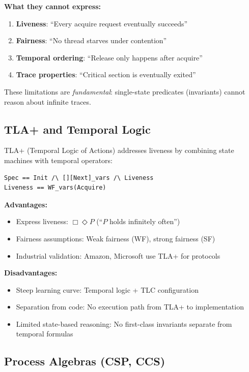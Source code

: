 \documentclass[conference]{IEEEtran}
\begin{document}
\textbf{What they cannot express:}

\begin{enumerate}
\item \textbf{Liveness}: ``Every acquire request eventually succeeds''
\item \textbf{Fairness}: ``No thread starves under contention''
\item \textbf{Temporal ordering}: ``Release only happens after acquire''
\item \textbf{Trace properties}: ``Critical section is eventually exited''
\end{enumerate}

These limitations are \textit{fundamental}: single-state predicates (invariants) cannot reason about infinite traces.

\subsection{TLA+ and Temporal Logic}

TLA+ (Temporal Logic of Actions) \cite{lamport2002} addresses liveness by combining state machines with temporal operators:

\begin{verbatim}
Spec == Init /\ [][Next]_vars /\ Liveness
Liveness == WF_vars(Acquire)
\end{verbatim}

\textbf{Advantages:}
\begin{itemize}
\item Express liveness: $\Box\Diamond P$ (``$P$ holds infinitely often'')
\item Fairness assumptions: Weak fairness (WF), strong fairness (SF)
\item Industrial validation: Amazon, Microsoft use TLA+ for protocols \cite{newcombe2015}
\end{itemize}

\textbf{Disadvantages:}
\begin{itemize}
\item Steep learning curve: Temporal logic + TLC configuration
\item Separation from code: No execution path from TLA+ to implementation
\item Limited state-based reasoning: No first-class invariants separate from temporal formulas
\end{itemize}

\subsection{Process Algebras (CSP, CCS)}
\end{document}
